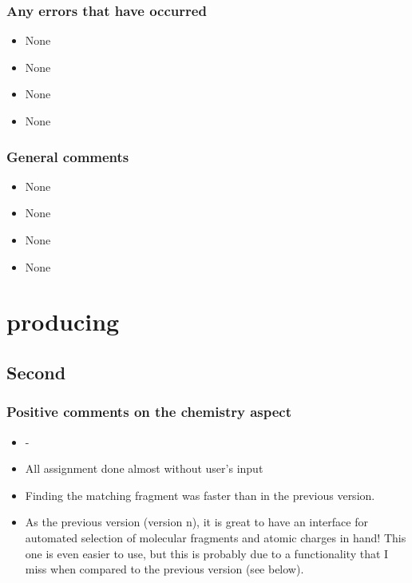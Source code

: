 \subsubsection{Any errors that have occurred}
\begin{itemize}
\item None

\item None

\item None

\item None

\end{itemize}


\subsubsection{General comments}
\begin{itemize}
\item None

\item None

\item None

\item None

\end{itemize}


\section{\oframp{} producing}
\subsection{Second}
\subsubsection{Positive comments on the chemistry aspect}
\begin{itemize}
\item -

\item All assignment done almost without user's input

\item Finding the matching fragment was faster than in the previous version.

\item As the previous version (version n), it is great to have an interface for automated selection of molecular fragments and atomic charges in hand! This one is even easier to use, but this is probably due to a functionality that I miss when compared to the previous version (see below).

\end{itemize}


